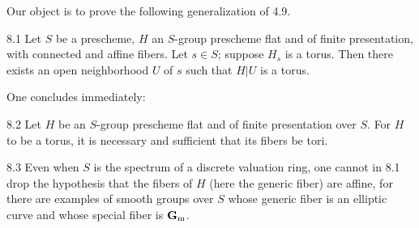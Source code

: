 Our object is to prove the following generalization of 4.9.
\begin{theorem}{8.1}\label{X.8.1}
Let $S$ be a prescheme, $H$ an $S$-group prescheme flat and of finite presentation, with connected and affine fibers. Let $s\in S$; suppose $H_s$ is a torus. Then there exists an open neighborhood $U$ of $s$ such that $H|U$ is a torus.
\end{theorem}
One concludes immediately:
\begin{corollary}{8.2}\label{X.8.2}
Let $H$ be an $S$-group prescheme flat and of finite presentation over $S$. For $H$ to be a torus, it is necessary and sufficient that its fibers be tori.
\end{corollary}
\begin{remark}{8.3}\label{X.8.3}
Even when $S$ is the spectrum of a discrete valuation ring, one cannot in 8.1 drop the hypothesis that the fibers of $H$ (here the generic fiber) are affine, for there are examples of smooth groups over $S$ whose generic fiber is an elliptic curve and whose special fiber is $\mathbf{G}_{\mathrm{m}}$.
\end{remark}

